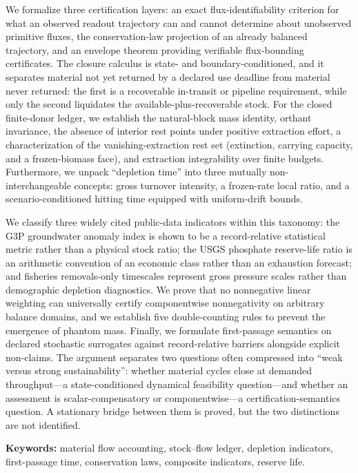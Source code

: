 \documentclass[11pt]{article}
\begin{document}
We formalize three certification layers: an exact flux-identifiability criterion for what an observed readout trajectory can and cannot determine about unobserved primitive fluxes, the conservation-law projection of an already balanced trajectory, and an envelope theorem providing verifiable flux-bounding certificates. The closure calculus is state- and boundary-conditioned, and it separates material not yet returned by a declared use deadline from material never returned: the first is a recoverable in-transit or pipeline requirement, while only the second liquidates the available-plus-recoverable stock. For the closed finite-donor ledger, we establish the natural-block mass identity, orthant invariance, the absence of interior rest points under positive extraction effort, a characterization of the vanishing-extraction rest set (extinction, carrying capacity, and a frozen-biomass face), and extraction integrability over finite budgets. Furthermore, we unpack ``depletion time'' into three mutually non-interchangeable concepts: gross turnover intensity, a frozen-rate local ratio, and a scenario-conditioned hitting time equipped with uniform-drift bounds.

We classify three widely cited public-data indicators within this taxonomy: the G3P groundwater anomaly index is shown to be a record-relative statistical metric rather than a physical stock ratio; the USGS phosphate reserve-life ratio is an arithmetic convention of an economic class rather than an exhaustion forecast; and fisheries removals-only timescales represent gross pressure scales rather than demographic depletion diagnostics. We prove that no nonnegative linear weighting can universally certify componentwise nonnegativity on arbitrary balance domains, and we establish five double-counting rules to prevent the emergence of phantom mass. Finally, we formulate first-passage semantics on declared stochastic surrogates against record-relative barriers alongside explicit non-claims. The argument separates two questions often compressed into ``weak versus strong sustainability'': whether material cycles close at demanded throughput---a state-conditioned dynamical feasibility question---and whether an assessment is scalar-compensatory or componentwise---a certification-semantics question. A stationary bridge between them is proved, but the two distinctions are not identified.

\textbf{Keywords:} material flow accounting, stock--flow ledger, depletion indicators, first-passage time, conservation laws, composite indicators, reserve life.
\end{document}
